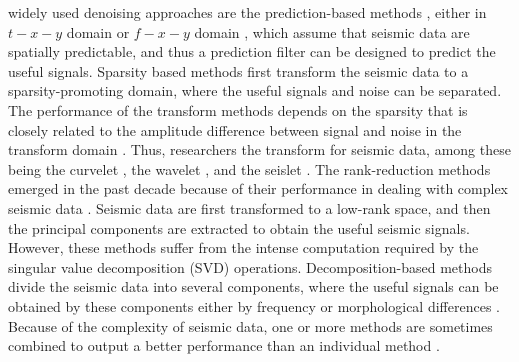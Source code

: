 widely used denoising approaches are the prediction-based methods \cite[]{canales1984}, either in $t-x-y$ domain \cite[]{abma1995} or $f-x-y$ domain \cite[]{guochang2012,guochang2013}, which assume that seismic data are spatially predictable, and thus a prediction filter can be designed to predict the useful signals. Sparsity based methods first transform the seismic data to a sparsity-promoting domain, where the useful signals and noise can be separated. The performance of the transform methods depends on the sparsity that is closely related to the amplitude difference between signal and noise in the transform domain \cite[]{amir2017,amir2017geo}. Thus, researchers  the  transform for seismic data, among these being the curvelet \cite[]{neelamani2008}, the wavelet \cite[]{mostafa2016geo,liuwei2016ewt}, and the seislet \cite[]{fomel2010seislet,shuwei20163} . The rank-reduction methods emerged in the past decade because of their  performance in dealing with complex seismic data \cite[]{mssa,weilin2016dmssa,yangkang2016irr5d,yangkang2019nc,wang2020low}. Seismic data are first transformed to a low-rank space, and then the principal components are extracted to obtain the useful seismic signals. However, these methods suffer from the intense computation required by the singular value decomposition (SVD) operations. Decomposition-based methods divide the seismic data into several components, where the useful signals can be obtained by  these components either by frequency or morphological differences \cite[]{huijian20161,weilin2020gji}. Because of the complexity of seismic data, one or more methods are sometimes combined to output a better performance than an individual method \cite[]{yangkang20141}. 

